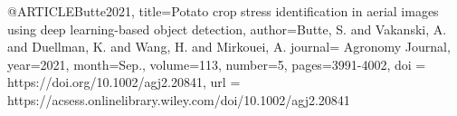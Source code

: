 @ARTICLE{Butte2021,
title={Potato crop stress identification in aerial images using deep learning-based object detection},
author={Butte, S. and Vakanski, A. and Duellman, K. and Wang, H. and Mirkouei, A.}
journal={ Agronomy Journal}, 
year={2021},
month={Sep.},
volume={113},
number={5},
pages={3991-4002},
doi = {https://doi.org/10.1002/agj2.20841},
url = {https://acsess.onlinelibrary.wiley.com/doi/10.1002/agj2.20841}
}
